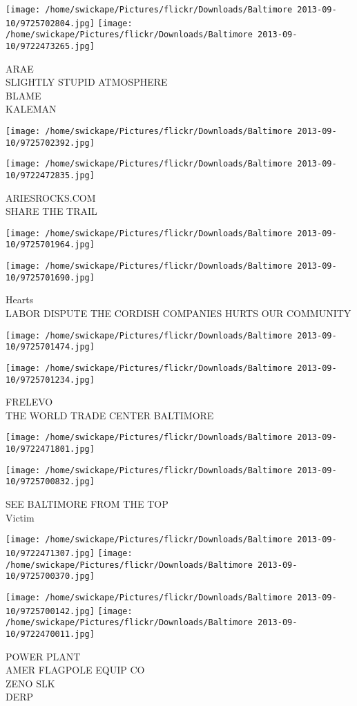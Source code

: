 \documentclass[10pt,letterpaper]{article}
\begin{document}
\texttt{[image: /home/swickape/Pictures/flickr/Downloads/Baltimore 2013-09-10/9725702804.jpg]}
\texttt{[image: /home/swickape/Pictures/flickr/Downloads/Baltimore 2013-09-10/9722473265.jpg]}

ARAE\\
SLIGHTLY STUPID ATMOSPHERE\\
BLAME\\
KALEMAN
\pagebreak

\texttt{[image: /home/swickape/Pictures/flickr/Downloads/Baltimore 2013-09-10/9725702392.jpg]}

\vspace{0.25in}
\texttt{[image: /home/swickape/Pictures/flickr/Downloads/Baltimore 2013-09-10/9722472835.jpg]}

ARIESROCKS.COM\\
SHARE THE TRAIL
\pagebreak

\texttt{[image: /home/swickape/Pictures/flickr/Downloads/Baltimore 2013-09-10/9725701964.jpg]}

\vspace{0.25in}
\texttt{[image: /home/swickape/Pictures/flickr/Downloads/Baltimore 2013-09-10/9725701690.jpg]}

Hearts\\
LABOR DISPUTE THE CORDISH COMPANIES HURTS OUR COMMUNITY
\pagebreak

\texttt{[image: /home/swickape/Pictures/flickr/Downloads/Baltimore 2013-09-10/9725701474.jpg]}

\vspace{0.25in}
\texttt{[image: /home/swickape/Pictures/flickr/Downloads/Baltimore 2013-09-10/9725701234.jpg]}

FRELEVO\\
THE WORLD TRADE CENTER BALTIMORE
\pagebreak

\texttt{[image: /home/swickape/Pictures/flickr/Downloads/Baltimore 2013-09-10/9722471801.jpg]}

\vspace{0.25in}
\texttt{[image: /home/swickape/Pictures/flickr/Downloads/Baltimore 2013-09-10/9725700832.jpg]}

SEE BALTIMORE FROM THE TOP\\
Victim
\pagebreak

\texttt{[image: /home/swickape/Pictures/flickr/Downloads/Baltimore 2013-09-10/9722471307.jpg]}
\texttt{[image: /home/swickape/Pictures/flickr/Downloads/Baltimore 2013-09-10/9725700370.jpg]}

\texttt{[image: /home/swickape/Pictures/flickr/Downloads/Baltimore 2013-09-10/9725700142.jpg]}
\texttt{[image: /home/swickape/Pictures/flickr/Downloads/Baltimore 2013-09-10/9722470011.jpg]}

POWER PLANT\\
AMER FLAGPOLE EQUIP CO\\
ZENO SLK\\
DERP
\pagebreak
\end{document}

